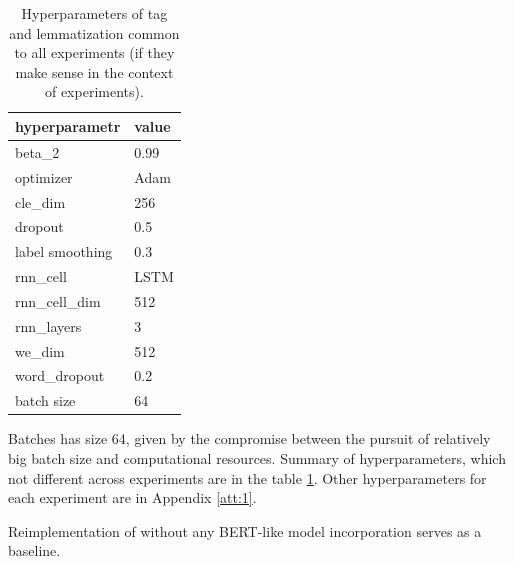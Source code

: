 \begin{table}[!h]
 \centering
\begin{tabular}{|l||l|}
\hline
hyperparametr   & \multicolumn{1}{l|}{value} \\ \hline \hline
beta\_2          & 0.99                       \\ \hline
optimizer       & Adam                       \\ \hline
cle\_dim         & 256                        \\ \hline
dropout         & 0.5                        \\ \hline
label smoothing & 0.3                        \\ \hline
rnn\_cell        & LSTM                       \\ \hline
rnn\_cell\_dim    & 512                        \\ \hline
rnn\_layers      & 3                          \\ \hline
we\_dim          & 512                        \\ \hline
word\_dropout    & 0.2                        \\ \hline
batch size & 64 \\ \hline
\end{tabular}
\caption{Hyperparameters of tag and lemmatization common to all experiments (if they make sense in the context of experiments).}
\label{tab:hyp_all}
\end{table}
Batches has size 64, given by the compromise between the pursuit of relatively big batch size and computational resources. Summary of hyperparameters, which not different across experiments are in the table \ref{tab:hyp_all}. Other hyperparameters for each experiment are in Appendix \ref{att:1}.
\par 
Reimplementation of \citep{Straka2019c} without any BERT-like model incorporation serves as a baseline.

